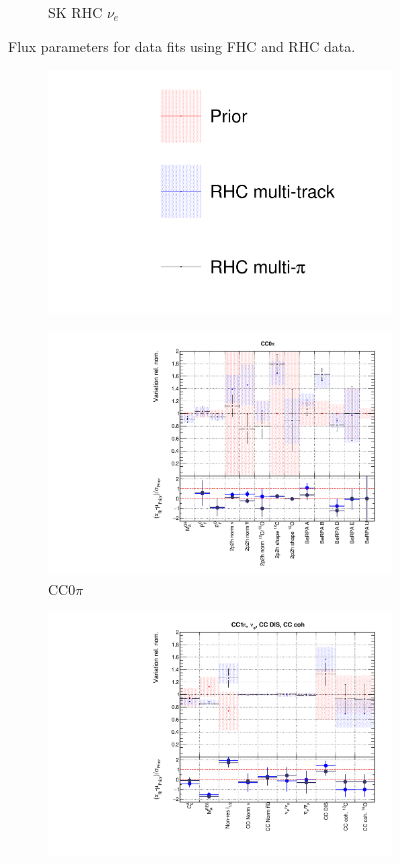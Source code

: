 \begin{figure}[t]
\begin{subfigure}{0.24\textwidth}
  \caption{SK RHC $\nu_{e}$}
  \label{fig:}
\end{subfigure}
\caption{Flux parameters for data fits using FHC and RHC data.}
\label{fig:rhcmpidat28SK}
\end{figure}

\begin{figure}[t]
\centering
\begin{subfigure}{0.95\textwidth}
  \centering
  \includegraphics[width=0.25\linewidth]{figs/rhcmpdat28_leg}
  \caption{}
  \label{fig:}
\end{subfigure}
\begin{subfigure}{0.49\textwidth}
  \centering
  \includegraphics[width=0.95\linewidth]{figs/rhcmpdatxsec28_1}
  \caption{CC0$\pi$}
  \label{fig:}
\end{subfigure}
\begin{subfigure}{0.49\textwidth}
  \centering
  \includegraphics[width=0.95\linewidth]{figs/rhcmpdatxsec28_2}

\end{subfigure}
\end{figure}
